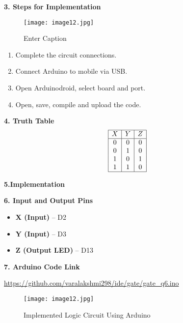 \documentclass[12pt]{article}
\begin{document}
\begin{multicols}{2}
\vspace{1em}
\noindent\textbf{3. Steps for Implementation}
\begin{figure}
    \centering
    \texttt{[image: image12.jpg]}
    \caption{Enter Caption}
    \label{fig:enter-label}
\end{figure}
\begin{enumerate}
    \item Complete the circuit connections.
    \item Connect Arduino to mobile via USB.
    \item Open Arduinodroid, select board and port.
    \item Open, save, compile and upload the code.
\end{enumerate}

\vspace{1em}
\noindent\textbf{4. Truth Table}
\[
\begin{array}{|c|c|c|}
\hline
X & Y & Z \\
\hline
0 & 0 & 0 \\
0 & 1 & 0 \\
1 & 0 & 1 \\
1 & 1 & 0 \\
\hline
\end{array}
\]

\end{multicols}

\vspace{1em}
\noindent\textbf{5.Implementation}

\noindent
{}


\vspace{1em}
\noindent\textbf{6. Input and Output Pins}
\begin{flushleft}
\begin{itemize}
    \item \textbf{X (Input)} – D2
    \item \textbf{Y (Input)} – D3
    \item \textbf{Z (Output LED)} – D13
\end{itemize}
\end{flushleft}

\vspace{1em}
\noindent\textbf{7. Arduino Code Link}

\noindent
\url{https://github.com/varalakshmi298/ide/gate/gate_q6.ino}

\vspace{1em}
\begin{figure}[H]
\texttt{[image: image12.jpg]}
\caption{Implemented Logic Circuit Using Arduino}
\end{figure}
\end{document}
